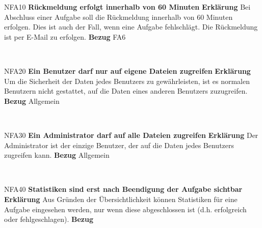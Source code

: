 \documentclass[a4paper,12pt]{article}
\begin{document}
\begin{itemize}[nosep]
	\leftskip=0.5cm
	\begin{minipage}[t]{\linewidth}
		\item[NFA10] \hspace{\parindent} \textbf{Rückmeldung erfolgt innerhalb von 60 Minuten}
		\subitem \textbf{Erklärung} Bei Abschluss einer Aufgabe soll die Rückmeldung innerhalb von 60 Minuten erfolgen. Dies ist auch der Fall, wenn eine Aufgabe fehlschlägt. Die Rückmeldung ist per E-Mail zu erfolgen.
\subitem \textbf{Bezug} FA6
	
	\end{minipage}
	\newline
	\\
	
	\begin{minipage}[t]{\linewidth}
		\item[NFA20]\hspace{\parindent} \textbf{Ein Benutzer darf nur auf eigene Dateien zugreifen}
		\subitem \textbf{Erklärung} Um die Sicherheit der Daten jedes Benutzers zu gewährleisten, ist es normalen Benutzern nicht gestattet, auf die Daten eines anderen Benutzers zuzugreifen.
\subitem \textbf{Bezug} Allgemein
	
	\end{minipage}
	\newline
	\\
	
	\begin{minipage}[t]{\linewidth}
		\item[NFA30]\hspace{\parindent} \textbf{Ein Administrator darf auf alle Dateien zugreifen}
		\subitem \textbf{Erklärung} Der Administrator ist der einzige Benutzer, der auf die Daten jedes Benutzers zugreifen kann.
\subitem \textbf{Bezug} Allgemein
	
	\end{minipage}
	\newline
	\\
	
	\begin{minipage}[t]{\linewidth}
		\item[NFA40] \hspace{\parindent} \textbf{Statistiken sind erst nach Beendigung der Aufgabe sichtbar}
		\subitem \textbf{Erklärung} Aus Gründen der Übersichtlichkeit können Statistiken für eine Aufgabe eingesehen werden, nur wenn diese abgeschlossen ist (d.h. erfolgreich oder fehlgeschlagen).
\subitem \textbf{Bezug} %
	

\end{minipage}
\end{itemize}
\end{document}
